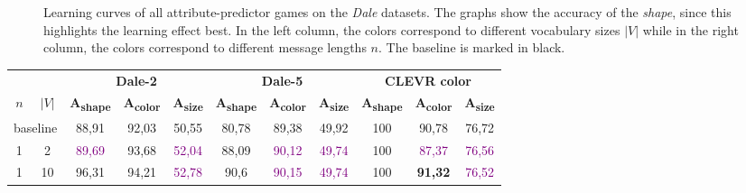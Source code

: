 \begin{figure}[ht!]
{        \label{fig:learning-curve_oh-generator_dale-5_max-len}
    }
    \caption{Learning curves of all attribute-predictor games on the \emph{Dale} datasets. The graphs show the accuracy of the \emph{shape}, since this highlights the learning effect best. In the left column, the colors correspond to different vocabulary sizes $|V|$ while in the right column, the colors correspond to different message lengths $n$. The baseline is marked in black.}
    \label{fig:learning-curves_oh-generator}
\end{figure}

\begin{table}[ht]
    \centering
    \begin{tabular}{cc|ccc|ccc|ccc}
        \toprule
                                      &         & \multicolumn{3}{c}{\textbf{Dale-2}} & \multicolumn{3}{c}{\textbf{Dale-5}} & \multicolumn{3}{c}{\textbf{CLEVR color}}                                                                                                                                                                                                           \\  \cmidrule(lr){3-5}\cmidrule(lr){6-8}\cmidrule(lr){9-11}
        $n$                           & $|V|$   & \textbf{A\textsubscript{shape}}     & \textbf{A\textsubscript{color}}     & \textbf{A\textsubscript{size}}           & \textbf{A\textsubscript{shape}} & \textbf{A\textsubscript{color}} & \textbf{A\textsubscript{size}} & \textbf{A\textsubscript{shape}} & \textbf{A\textsubscript{color}} & \textbf{A\textsubscript{size}} \\\midrule
        \multicolumn{2}{c|}{baseline} & {88,91} & {92,03}                             & {50,55}                             & {80,78}                                  & {89,38}                         & {49,92}                         & {100}                          & {90,78}                         & {76,72}                                                          \\\midrule
        {1}                           & {2}     & \textcolor{purple}{89,69}           & {93,68}                             & \textcolor{purple}{52,04}                & {88,09}                         & \textcolor{purple}{90,12}       & \textcolor{purple}{49,74}      & {100}                           & \textcolor{purple}{87,37}       & \textcolor{purple}{76,56}      \\
        {1}                           & {10}    & {96,31}                             & {94,21}                             & \textcolor{purple}{52,78}                & {90,6}                          & \textcolor{purple}{90,15}       & \textcolor{purple}{49,74}      & {100}                           & \textbf{91,32}                  & \textcolor{purple}{76,52}      \\

\end{tabular}
\end{table}
